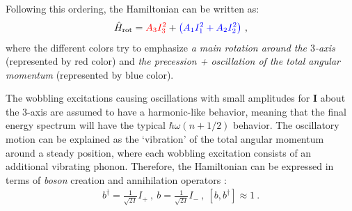 Following this ordering, the Hamiltonian can be written as:
\begin{align}
    \hat{H}_\text{rot}={\color{red}A_3I_3^2}+{\color{blue}\left(A_1I_1^2+A_2I_2^2\right)}\ ,
    \label{general-rotor-ham-evenA}
\end{align}
where the different colors try to emphasize \emph{a main rotation around the $3$-axis} (represented by red color) and \emph{the precession + oscillation of the total angular momentum} (represented by blue color).

The wobbling excitations causing oscillations with small amplitudes for $\mathbf{I}$ about the $3$-axis are assumed to have a harmonic-like behavior, meaning that the final energy spectrum will have the typical $\hbar\omega(n+1/2)$ behavior. The oscillatory motion can be explained as the `vibration' of the total angular momentum around a steady position, where each wobbling excitation consists of an additional vibrating phonon. Therefore, the Hamiltonian can be expressed in terms of \emph{boson} creation and annihilation operators \cite{bohr1998nuclear}:
\begin{align}
    b^\dagger=\frac{1}{\sqrt{2I}}I_+\ ,\ b=\frac{1}{\sqrt{2I}}I_-\ ,\ \left[b,b^\dagger\right]\approx 1\ .
\end{align}

